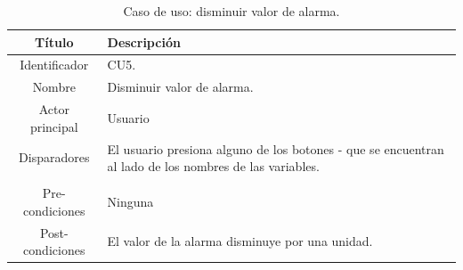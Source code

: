\begin{table}[t!]
	\centering
	\caption{Caso de uso: disminuir valor de alarma.}
	\centering
	\begin{tabular}{c p{}}    
		\toprule
		\textbf{Título }     & \textbf{Descripción} \\
		\midrule
		Identificador		&	CU5. \\
		Nombre				& 	Disminuir valor de alarma. \\
		Actor principal		&   Usuario \\
		Disparadores		&   El usuario presiona alguno de los botones - que se encuentran al lado de los nombres de las variables. \\
\\
		Pre-condiciones		&   Ninguna \\
		Post-condiciones	&   El valor de la alarma disminuye por una unidad.\\
		\bottomrule
	\end{tabular}
\label{tab:caso-decrementar}
\end{table}

